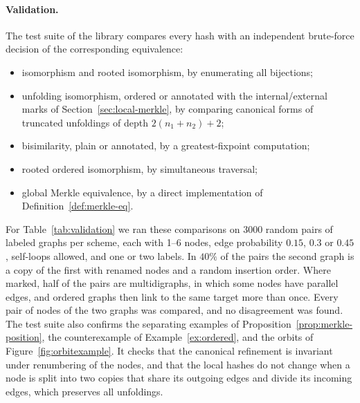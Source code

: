 \documentclass[twoside,leqno]{article}
\begin{document}
\paragraph{Validation.} The test suite of the library compares every hash with an independent brute-force decision of the corresponding equivalence:
\begin{itemize}
  \item isomorphism and rooted isomorphism, by enumerating all bijections;
  \item unfolding isomorphism, ordered or annotated with the internal/external marks of Section~\ref{sec:local-merkle}, by comparing canonical forms of truncated unfoldings of depth $2(n_1+n_2)+2$;
  \item bisimilarity, plain or annotated, by a greatest-fixpoint computation;
  \item rooted ordered isomorphism, by simultaneous traversal;
  \item global Merkle equivalence, by a direct implementation of Definition~\ref{def:merkle-eq}.
\end{itemize}
For Table~\ref{tab:validation} we ran these comparisons on 3000 random pairs of labeled graphs per scheme, each with 1--6 nodes, edge probability $0.15$, $0.3$ or $0.45$, self-loops allowed, and one or two labels. In $40\%$ of the pairs the second graph is a copy of the first with renamed nodes and a random insertion order. Where marked, half of the pairs are multidigraphs, in which some nodes have parallel edges, and ordered graphs then link to the same target more than once. Every pair of nodes of the two graphs was compared, and no disagreement was found. The test suite also confirms the separating examples of Proposition~\ref{prop:merkle-position}, the counterexample of Example~\ref{ex:ordered}, and the orbits of Figure~\ref{fig:orbitexample}. It checks that the canonical refinement is invariant under renumbering of the nodes, and that the local hashes do not change when a node is split into two copies that share its outgoing edges and divide its incoming edges, which preserves all unfoldings.
\end{document}
